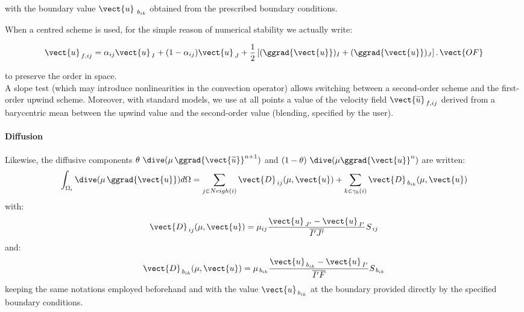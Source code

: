 with the boundary value ${\vect{u}_{\ {b}_{ik}}}$ obtained from the prescribed
boundary conditions.

\noindent{}
When a centred scheme is used, for the simple reason of numerical stability
we actually write:

\begin{equation}\notag
\vect{u}_{\,f,ij} = \alpha_{ij} \vect{u}_{\,I} +  (1-\alpha_{ij})
\vect{u}_{\,J} +
\frac{1}{2}\left[(\ggrad{\vect{u}})_I+(\ggrad{\vect{u}})_J\right] \text{.}\, \vect{OF}
\end{equation}

to preserve the order in space.\\
A slope test (which may introduce nonlinearities in the convection operator)
allows switching between a second-order scheme and the first-order upwind scheme.
Moreover, with standard models, we use at all points a value of the velocity field
$\vect{\widetilde{u}}_{\,f,ij}$ derived from a barycentric mean between the upwind
value and the second-order value (blending, specified by the user).
\paragraph{\bf Diffusion\\}
Likewise, the diffusive components $\theta\,\,\dive(\mu\,\ggrad{\vect{\widetilde{u}}}^{n+1})$ and $(1-\theta)\,\,\dive(\mu \ggrad{\vect{u}}^{n})$ are written:
\begin{equation}\notag
\int_{\Omega_i}{\dive(\mu\, \ggrad{\vect{u}}) d\Omega} =
\sum_{j\in Neigh(i)}{\vect{D}_{\,ij}(\mu, \vect{u})}
+\sum_{k\in {\gamma_b(i)}} {\vect{D}_{\,{b}_{ik}}(\mu,\vect{u})}
\end{equation}
with:
\begin{equation}
\vect{D}_{\,ij}(\mu, \vect{u}) = \mu_{ij}
\frac{\vect{u}_{\,J'}-\vect{u}_{\,I'}}{\overline{I'J'}} S_{\,ij}
\end{equation}
and:
\begin{equation}
\vect{D}_{\,b_{ik}}(\mu, \vect{u}) = \mu_{\,b_{ik}}
\frac{\vect{u}_{\,b_{ik}}-\vect{u}_{\,I'}}{\overline{I'F}} S_{\,b_{ik}}
\end{equation}
keeping the same notations employed beforehand and with the value
${\vect{u}_{\,{b}_{ik}}}$ at the boundary provided directly by the specified
boundary conditions.

